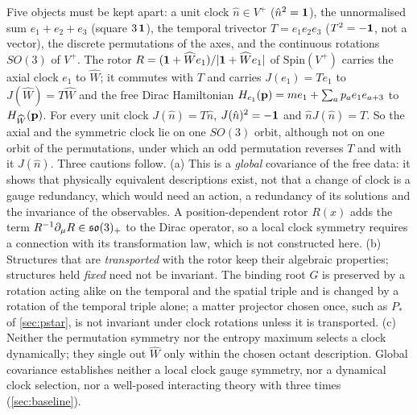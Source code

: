 \begin{remark}
\label{rem:clockcov}
Five objects must be kept apart: a unit clock $\hat n\in V^+$ ($\hat n^2=\mathbf 1$), the unnormalised sum $e_1+e_2+e_3$ (square $3\,\mathbf 1$), the temporal trivector
$T=e_1e_2e_3$ ($T^2=-\mathbf 1$, not a vector), the discrete permutations of the axes, and the continuous rotations $SO(3)$ of $V^+$. The rotor
$R=(\mathbf 1+\widehat We_1)/|\mathbf 1+\widehat We_1|$ of $\mathrm{Spin}(V^+)$ carries the axial clock $e_1$ to $\widehat W$; it commutes with $T$ and carries
$J(e_1)=Te_1$ to $J(\widehat W)=T\widehat W$ and the free Dirac Hamiltonian $H_{e_1}(\mathbf p)=me_1+\sum_ap_ae_1e_{a+3}$ to $H_{\widehat W}(\mathbf p)$. For every unit
clock $J(\hat n)=T\hat n$, $J(\hat n)^2=-\mathbf 1$ and $\hat nJ(\hat n)=T$. So the axial and the symmetric clock lie on one $SO(3)$ orbit, although not on one orbit of the
permutations, under which an odd permutation reverses $T$ and with it $J(\hat n)$. Three cautions follow. (a) This is a \emph{global} covariance of
the free data: it shows that physically equivalent descriptions exist, not that a change of clock is a gauge redundancy, which would
need an action, a redundancy of its solutions and the invariance of the observables. A position-dependent rotor $R(x)$ adds the term
$R^{-1}\partial_\mu R\in\mathfrak{so}(3)_+$ to the Dirac operator, so a local clock symmetry requires a connection with its transformation law, which is
not constructed here. (b) Structures that are \emph{transported} with the rotor keep their algebraic properties; structures held
\emph{fixed} need not be invariant. The binding root $G$ is preserved by a rotation acting alike on the temporal and the spatial triple and
is changed by a rotation of the temporal triple alone; a matter projector chosen once, such as $P_*$ of \cref{sec:pstar}, is not
invariant under clock rotations unless it is transported. (c) Neither the permutation symmetry nor the entropy maximum selects a clock
dynamically; they single out $\widehat W$ only within the chosen octant description. Global covariance establishes neither a local
clock gauge symmetry, nor a dynamical clock selection, nor a well-posed interacting theory with three times (\cref{sec:baseline}).
\end{remark}


